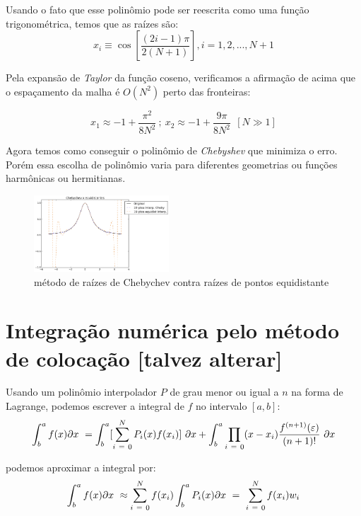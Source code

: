  Usando o fato que esse polinômio pode ser reescrita como uma função trigonométrica, temos que as raízes são:
 \begin{equation}
  x_i  \equiv \cos \left [ \frac{(2i - 1)\pi}{2(N+1)}  \right ] , i = 1,2,..., N+1
 \end{equation}
 
 Pela expansão de \emph{Taylor} da função coseno, verificamos a afirmação de acima que o espaçamento da malha é $O(N^2)$ perto das fronteiras:
 
 \begin{equation}
  x_1 \approx -1 + \frac{\pi^2}{8N^2}\ ;\ x_2 \approx -1 + \frac{9\pi}{8N^2}\ \ [N\gg 1]
 \end{equation}
 
 Agora temos como conseguir o polinômio de \emph{Chebyshev} que minimiza o erro. Porém essa escolha de polinômio varia para diferentes geometrias ou funções harmônicas ou hermitianas.
 \begin{figure}[t]
 \includegraphics[width=0.45\textwidth, center]{figuras/chebychev_equidist.png}
 \caption{método de raízes de Chebychev contra raízes de pontos equidistante}
 \end{figure}
\pagebreak
\section{Integração numérica pelo método de colocação [talvez alterar]}
 Usando um polinômio interpolador $P$ de grau menor ou igual a $n$ na forma de Lagrange, podemos escrever a integral de $f$ no intervalo $[a,b]$:\\
 
\begin{equation}
\int^{a}_b f(x) \partial x\ = \int^{a}_b[\sum_{i\ =\ 0}^N P_i(x) f(x_i)]\ \partial x +  \int^{a}_b \prod_{i\ =\ 0} (x - x_i)\frac{f^{(n+1)}(\varepsilon)}{(n+1)!}\ \partial x\\
\end{equation}

podemos aproximar a integral por:
\begin{equation}
   \int^{a}_b f(x) \partial x\ \approx \sum_{i\ =\ 0}^N f(x_i) \int^{a}_b P_i(x) \partial x\ =\ \sum_{i\ =\ 0}^N f(x_i) w_i \\
\end{equation}

